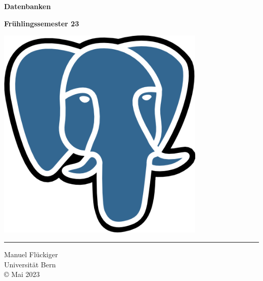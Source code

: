 \documentclass[12pt,deu]{skript_ogg}
\begin{document}
\thispagestyle{empty}
\begin{titlepage}

\begin{center}

\vspace*{0cm} {\setlength{\baselineskip}{8ex}

{\Huge\textbf{Datenbanken}\\[2.5cm]}

{\Large\textbf{Fr\"uhlingssemester 23}}}

\vspace{5mm}

\includegraphics[width=10cm]{Postgresql_elephant.png}
\end{center}

\vfill


\rule{\textwidth}{0.5pt}

\begin{flushright}
Manuel Fl\"uckiger\\
Universit\"at Bern\\
\vspace{5mm} \copyright\,\,Mai 2023
\end{flushright}

\end{titlepage}


\clearpage


\clearpage
\tableofcontents        %
\newpage

\clearpage

\end{document}
